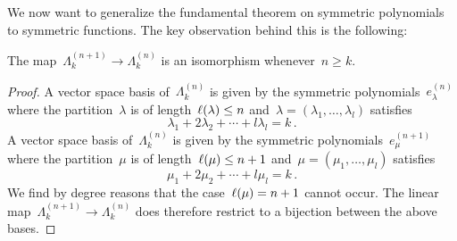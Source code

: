 \documentclass[a4paper,11pt]{scrartcl}
\begin{document}
%
%

We now want to generalize the fundamental theorem on symmetric polynomials to symmetric functions.
The key observation behind this is the following:

\begin{proposition}
  \label{sequence stabilizes}
  The map~$\Lambda^{(n+1)}_k \to \Lambda^{(n)}_k$ is an isomorphism whenever~$n \geq k$. 
\end{proposition}

\begin{proof}
  A vector space basis of~$\Lambda^{(n)}_k$ is given by the symmetric polynomials~$e^{(n)}_\lambda$ where the partition~$\lambda$ is of length~$\ell(\lambda) \leq n$ and~$\lambda = (\lambda_1, \dotsc, \lambda_l)$ satisfies
  \[
    \lambda_1 + 2 \lambda_2 + \dotsb + l \lambda_l = k \,.
  \]
  A vector space basis of~$\Lambda^{(n)}_k$ is given by the symmetric polynomials~$e^{(n+1)}_\mu$ where the partition~$\mu$ is of length~$\ell(\mu) \leq n+1$ and~$\mu = (\mu_1, \dotsc, \mu_l)$ satisfies
  \[
    \mu_1 + 2 \mu_2 + \dotsb + l \mu_l = k \,.
  \]
  We find by degree reasons that the case~$\ell(\mu) = n+1$ cannot occur.
  The linear map~$\Lambda^{(n+1)}_k \to \Lambda^{(n)}_k$ does therefore restrict to a bijection between the above bases.
\end{proof}
\end{document}
